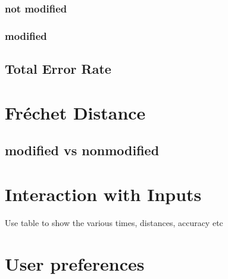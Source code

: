 \subsubsection{not modified}

\subsubsection{modified}

\subsection{Total Error Rate}

\section{Fréchet Distance}

\subsection{modified vs nonmodified}

\section{Interaction with Inputs}

Use table to show the various times, distances, accuracy etc

\section{User preferences}
